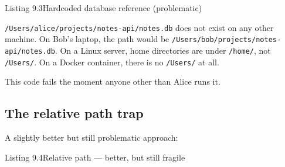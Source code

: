 \begin{codeboxcap}[short]{\textcolor{accent}{Listing 9.3}\enspace Hardcoded database reference (problematic)}

\begin{Shaded}
\begin{Highlighting}[]

\OperatorTok{=} 

\end{Highlighting}
\end{Shaded}

\end{codeboxcap}

\noindent{}\texttt{/}\allowbreak{}\texttt{Users/}\allowbreak{}\texttt{alice/}\allowbreak{}\texttt{projects/}\allowbreak{}\texttt{notes-}\allowbreak{}\texttt{api/}\allowbreak{}\texttt{notes.}\allowbreak{}\texttt{db} does not exist on any other machine. On Bob's laptop, the path would be \texttt{/}\allowbreak{}\texttt{Users/}\allowbreak{}\texttt{bob/}\allowbreak{}\texttt{projects/}\allowbreak{}\texttt{notes-}\allowbreak{}\texttt{api/}\allowbreak{}\texttt{notes.}\allowbreak{}\texttt{db}. On a Linux server, home directories are under \texttt{/home/}, not \texttt{/Users/}. On a Docker container, there is no \texttt{/Users/} at all.

This code fails the moment anyone other than Alice runs it.

\subsection*{The relative path trap}\label{09-configuration-coupling:the-relative-path-trap}

A slightly better but still problematic approach:

\begin{codeboxcap}[short]{\textcolor{accent}{Listing 9.4}\enspace Relative path --- better, but still fragile}

\begin{Shaded}
\begin{Highlighting}[]
\OperatorTok{=} 
\end{Highlighting}
\end{Shaded}

\end{codeboxcap}

